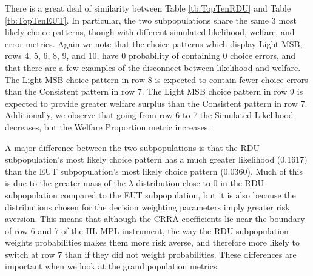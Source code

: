 \documentclass[../main.tex]{subfiles}
\begin{document}
There is a great deal of similarity between Table \ref{tb:TopTenRDU} and Table \ref{tb:TopTenEUT}.
In particular, the two subpopulations share the same $3$ most likely choice patterns, though with different simulated likelihood, welfare, and error metrics.
Again we note that the choice patterns which display Light MSB, rows 4, 5, 6, 8, 9, and 10, have $0$ probability of containing $0$ choice errors, and that there are a few examples of the disconnect between likelihood and welfare.
The Light MSB choice pattern in row 8 is expected to contain fewer choice errors than the Consistent pattern in row 7.
The Light MSB choice pattern in row 9 is expected to provide greater welfare surplus than the Consistent pattern in row 7.
Additionally, we observe that going from row 6 to 7 the Simulated Likelihood decreases, but the Welfare Proportion metric increases.

A major difference between the two subpopulations is that the RDU subpopulation's most likely choice pattern has a much greater likelihood (0.1617) than the EUT subpopulation's most likely choice pattern (0.0360).
Much of this is due to the greater mass of the $\lambda$ distribution close to $0$ in the RDU subpopulation compared to the EUT subpopulation, but it is also because the distributions chosen for the decision weighting parameters imply greater risk aversion.
This means that although the CRRA coefficients lie near the boundary of row 6 and 7 of the HL-MPL instrument, the way the RDU subpopulation weights probabilities makes them more risk averse, and therefore more likely to switch at row 7 than if they did not weight probabilities.
These differences are important when we look at the grand population metrics.
\end{document}
